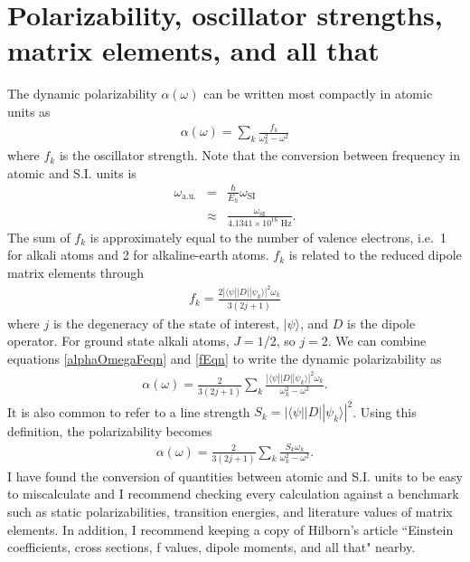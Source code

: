 \section{Polarizability, oscillator strengths, matrix elements, and all that}
\label{dynPolSec}
The dynamic polarizability $\alpha(\omega)$ can be written most compactly in atomic units as
\begin{eqnarray}
\label{alphaOmegaFeqn}
\alpha(\omega)=\sum_k\frac{f_{k}}{\omega_k^2-\omega^2}
\end{eqnarray}
where $f_k$ is the oscillator strength. Note that the conversion between frequency in atomic and S.I. units is
\begin{eqnarray}
\label{omegaAUSI}
\omega_\textrm{a.u.}&=&\frac{\hbar}{E_h}\omega_\textrm{SI}\nonumber\\
&\approx&\frac{\omega_\textrm{SI}}{4.1341\times10^{16} \textrm{ Hz}} .
\end{eqnarray}
The sum of $f_k$ is approximately equal to the number of valence electrons, i.e.~1 for alkali atoms and 2 for alkaline-earth atoms. $f_k$ is related to the reduced dipole matrix elements through
\begin{eqnarray}
\label{fEqn}
f_k=\frac{2 |\langle \psi || D || \psi_k \rangle|^2 \omega_k}{3(2j+1)}
\end{eqnarray}
where $j$ is the degeneracy of the state of interest, $|\psi\rangle$, and $D$ is the dipole operator. For ground state alkali atoms, $J=1/2$, so $j=2$. We can combine equations \ref{alphaOmegaFeqn} and \ref{fEqn} to write the dynamic polarizability as
\begin{eqnarray}
\label{alphaOmegaMatrixElmEqn}
\alpha(\omega)=\frac{2}{3(2j+1)}\sum_k \frac{|\langle \psi || D || \psi_k \rangle|^2 \omega_k}{\omega_k^2-\omega^2}.
\end{eqnarray}
It is also common to refer to a line strength $S_k = |\langle \psi || D || \psi_k \rangle|^2$. Using this definition, the polarizability becomes
\begin{eqnarray}
\label{alphaOmegaSeqn}
\alpha(\omega)=\frac{2}{3(2j+1)}\sum_k \frac{S_k \omega_k}{\omega_k^2-\omega^2}.
\end{eqnarray}
I have found the conversion of quantities between atomic and S.I. units to be easy to miscalculate and I recommend checking every calculation against a benchmark such as static polarizabilities, transition energies, and literature values of matrix elements. In addition, I recommend keeping a copy of Hilborn's article ``Einstein coefficients, cross sections, f values, dipole moments, and all that" \cite{Hil82} nearby.


